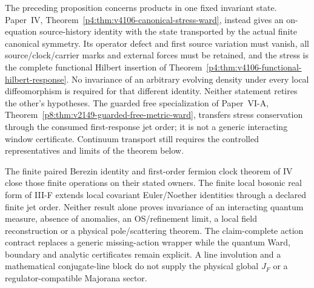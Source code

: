 \documentclass[12pt,a4paper]{article}
\begin{document}
\begin{remark}
\label{p12:rem:v2106-two-finite-ward-domains}
The preceding proposition concerns products in one fixed invariant state.
Paper~IV, Theorem~\ref{p4:thm:v4106-canonical-stress-ward}, instead gives
an on-equation source-history identity with the state transported by the
actual finite canonical symmetry. Its operator defect and first source
variation must vanish, all source/clock/carrier marks and external forces
must be retained, and the stress is the complete functional Hilbert insertion
of Theorem~\ref{p4:thm:v4106-functional-hilbert-response}.
No invariance of an arbitrary evolving density under every local
diffeomorphism is required for that different identity.
Neither statement retires the other's hypotheses. The guarded free
specialization of Paper~VI-A,
Theorem~\ref{p8:thm:v2149-guarded-free-metric-ward}, transfers stress
conservation through the consumed first-response jet order; it is not
a generic interacting window certificate. Continuum transport still
requires the controlled representatives and limits of the theorem below.
\end{remark}

\begin{remark}
\label{p12:rem:m8-batch-quantum-inputs}
The finite paired Berezin identity and first-order
fermion clock theorem of IV close those finite
operations on their stated owners.  The finite local
bosonic real form of III-F extends local covariant
Euler/Noether identities through a declared finite
jet order.  Neither result alone proves invariance
of an interacting quantum measure, absence of
anomalies, an OS/refinement limit, a local field
reconstruction or a physical pole/scattering theorem.
The claim-complete action contract replaces a generic
missing-action wrapper while the quantum Ward,
boundary and analytic certificates remain explicit.
A line involution and a mathematical conjugate-line
block do not supply the physical global \(J_F\) or
a regulator-compatible Majorana sector.
\end{remark}
\end{document}
